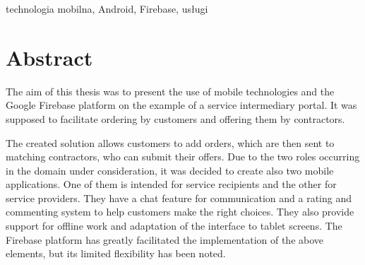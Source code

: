 

\vspace{1cm}
technologia mobilna, Android, Firebase, usługi
\clearpage

\section*{Abstract}
\vspace{1cm}

The aim of this thesis was to present the use of mobile technologies and the Google Firebase platform on the example of a service intermediary portal. It was supposed to facilitate ordering by customers and offering them by contractors.

The created solution allows customers to add orders, which are then sent to matching contractors, who can submit their offers. Due to the two roles occurring in the domain under consideration, it was decided to create also two mobile applications. One of them is intended for service recipients and the other for service providers. They have a chat feature for communication and a rating and commenting system to help customers make the right choices. They also provide support for offline work and adaptation of the interface to tablet screens. The Firebase platform has greatly facilitated the implementation of the above elements, but its limited flexibility has been noted.

